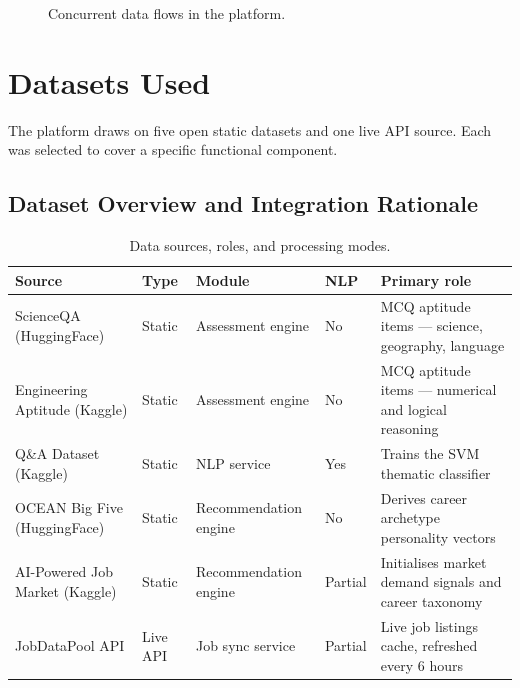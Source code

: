 \begin{figure}[h]
  \centering
  \caption{Concurrent data flows in the platform.}
  \label{fig:dataflow}
\end{figure}

\section{Datasets Used}
\label{sec:datasets}

The platform draws on five open static datasets and one live API source. Each
was selected to cover a specific functional component.

\subsection{Dataset Overview and Integration Rationale}

\begin{table}[h]
\centering
\caption{Data sources, roles, and processing modes.}
\label{tab:datasets}
\renewcommand{\arraystretch}{1.35}
\begin{tabular}{p{3.4cm} p{1.5cm} p{2.6cm} p{1.5cm} p{3.6cm}}
\hline
\textbf{Source} & \textbf{Type} & \textbf{Module} & \textbf{NLP} & \textbf{Primary role} \\
\hline
ScienceQA (HuggingFace)
  & Static & Assessment engine & No
  & MCQ aptitude items --- science, geography, language \\
Engineering Aptitude (Kaggle)
  & Static & Assessment engine & No
  & MCQ aptitude items --- numerical and logical reasoning \\
Q\&A Dataset (Kaggle)
  & Static & NLP service & Yes
  & Trains the SVM thematic classifier \\
OCEAN Big Five (HuggingFace)
  & Static & Recommendation engine & No
  & Derives career archetype personality vectors \\
AI-Powered Job Market (Kaggle)
  & Static & Recommendation engine & Partial
  & Initialises market demand signals and career taxonomy \\
JobDataPool API
  & Live API & Job sync service & Partial
  & Live job listings cache, refreshed every 6 hours \\
\hline
\end{tabular}
\end{table}


